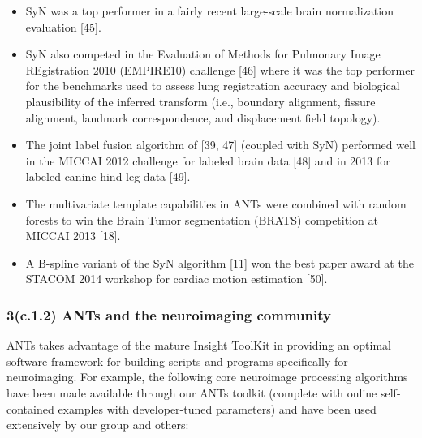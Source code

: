 \documentclass[11pt,]{article}
\begin{document}
\begin{itemize}
\itemsep1pt\parskip0pt
\item
  SyN was a top performer in a fairly recent large-scale brain
  normalization evaluation {[}45{]}.
\item
  SyN also competed in the Evaluation of Methods for Pulmonary Image
  REgistration 2010 (EMPIRE10) challenge {[}46{]} where it was the top
  performer for the benchmarks used to assess lung registration accuracy
  and biological plausibility of the inferred transform (i.e., boundary
  alignment, fissure alignment, landmark correspondence, and
  displacement field topology).
\item
  The joint label fusion algorithm of {[}39, 47{]} (coupled with SyN)
  performed well in the MICCAI 2012 challenge for labeled brain data
  {[}48{]} and in 2013 for labeled canine hind leg data {[}49{]}.
\item
  The multivariate template capabilities in ANTs were combined with
  random forests to win the Brain Tumor segmentation (BRATS) competition
  at MICCAI 2013 {[}18{]}.
\item
  A B-spline variant of the SyN algorithm {[}11{]} won the best paper
  award at the STACOM 2014 workshop for cardiac motion estimation
  {[}50{]}.
\end{itemize}

\subsubsection{3(c.1.2) ANTs and the neuroimaging
community}\label{c.1.2-ants-and-the-neuroimaging-community}

ANTs takes advantage of the mature Insight ToolKit in providing an
optimal software framework for building scripts and programs
specifically for neuroimaging. For example, the following core
neuroimage processing algorithms have been made available through our
ANTs toolkit (complete with online self-contained examples with
developer-tuned parameters) and have been used extensively by our group
and others:
\end{document}
